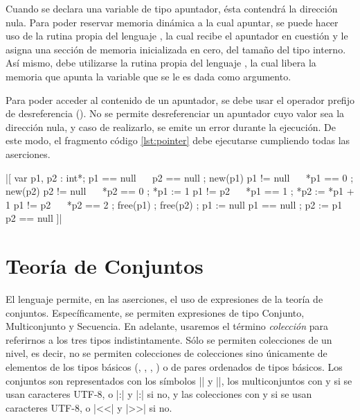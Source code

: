 Cuando se declara una variable de tipo apuntador, ésta contendrá la dirección
nula. Para poder reservar memoria dinámica a la cual apuntar, se puede hacer
uso de la rutina propia del lenguaje , la cual recibe el apuntador
en cuestión y le asigna una sección de memoria inicializada en cero, del
tamaño del tipo interno. Así mismo, debe utilizarse la rutina propia del
lenguaje , la cual libera la memoria que apunta la variable que
se le es dada como argumento.

Para poder acceder al contenido de un apuntador, se debe usar el operador
prefijo de desreferencia (\ingra{*}). No se permite desreferenciar un
apuntador cuyo valor sea la dirección nula, y caso de realizarlo, se emite un
error durante la ejecución. De este modo, el fragmento código
\ref{lst:pointer} debe ejecutarse cumpliendo todas las aserciones.

\begin{gracielacode}[caption=Uso de apuntadores, label=lst:pointer]
|[ var p1, p2 : int*; { p1 == null ~\Land~ p2 == null }
 ; new(p1)            { p1 != null ~\Land~ *p1 == 0 }
 ; new(p2)            { p2 != null ~\Land~ *p2 == 0 }
 ; *p1 := 1           { p1 != p2 ~\Land~ *p1 == 1 }
 ; *p2 := *p1 + 1     { p1 != p2 ~\Land~ *p2 == 2 }
 ; free(p1)
 ; free(p2)
 ; p1 := null         { p1 == null }
 ; p2 := p1           { p2 == null }
]|
\end{gracielacode}

\section{Teoría de Conjuntos}

El lenguaje permite, en las aserciones, el uso de expresiones de la teoría de
conjuntos. Específicamente, se permiten expresiones de tipo Conjunto,
Multiconjunto y Secuencia. En adelante, usaremos el término \textit{colección}
para referirnos a los tres tipos indistintamente. Sólo se permiten colecciones
de un nivel, es decir, no se permiten colecciones de colecciones sino únicamente
de elementos de los tipos básicos (, , ,
) o de pares ordenados de tipos básicos. Los conjuntos son
representados con los símbolos \ingra|{| y \ingra|}|, los multiconjuntos con
\Lbag{} y \Rbag{} si se usan caracteres UTF-8, o \ingra|{:| y \ingra|:}| si no, y
las colecciones con \Lseq{} y \Rseq{} si se usan caracteres UTF-8, o \ingra|<<| y
\ingra|>>| si no.


